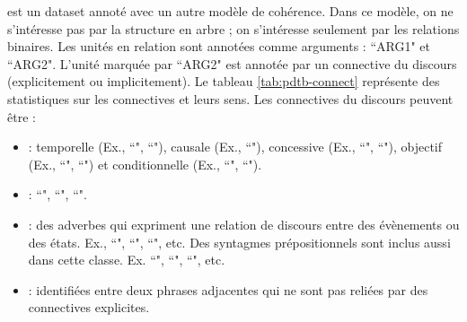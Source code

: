 \documentclass{KodeBook}
\begin{document}
 est un dataset annoté avec un autre modèle de cohérence. 
Dans ce modèle, on ne s'intéresse pas par la structure en arbre ; on s'intéresse seulement par les relations binaires. 
Les unités en relation sont annotées comme arguments : ``ARG1" et ``ARG2". 
L'unité marquée par ``ARG2" est annotée par un connective du discours (explicitement ou implicitement). 
Le tableau \ref{tab:pdtb-connect} représente des statistiques sur les connectives et leurs sens.
Les connectives du discours peuvent être :
\begin{itemize}
	\item {} :  
	temporelle (Ex., ``", ``"), 
	causale (Ex., ``"), 
	concessive (Ex., ``", ``"), 
	objectif (Ex., ``", ``") et 
	conditionnelle (Ex., ``", ``").
	
	\item {} : ``", ``", ``".
	
	\item {} : des adverbes qui expriment une relation de discours entre des évènements ou des états. Ex., ``", ``", ``", etc.
	Des syntagmes prépositionnels sont inclus aussi dans cette classe. Ex. ``",
		``", ``", etc.
	
	\item {} :  identifiées entre deux phrases adjacentes qui ne sont pas reliées par des connectives explicites.
\end{itemize}
\end{document}
